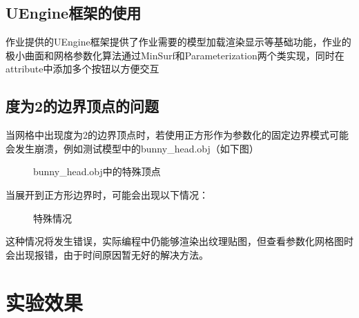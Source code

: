 \documentclass[14pt]{scrartcl} %
\begin{document}
	\subsection{UEngine框架的使用}
	
	作业提供的UEngine框架提供了作业需要的模型加载渲染显示等基础功能，作业的极小曲面和网格参数化算法通过MinSurf和Parameterization两个类实现，同时在attribute中添加多个按钮以方便交互
	
	\subsection{度为2的边界顶点的问题}
	当网格中出现度为2的边界顶点时，若使用正方形作为参数化的固定边界模式可能会发生崩溃，例如测试模型中的bunny\_head.obj（如下图）
	\begin{figure}[h] %
		\centering
		\caption{bunny\_head.obj中的特殊顶点 }
	\end{figure}
	
	当展开到正方形边界时，可能会出现以下情况：
	\begin{figure}[h] %
		\centering
		\caption{特殊情况 }
	\end{figure}
	
	这种情况将发生错误，实际编程中仍能够渲染出纹理贴图，但查看参数化网格图时会出现报错，由于时间原因暂无好的解决方法。
	
	\pagebreak
	
	\section{实验效果}
	
\end{document}
